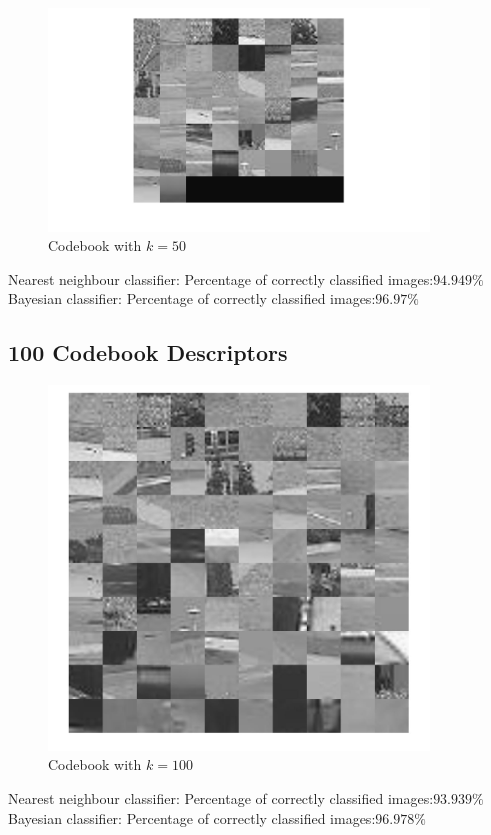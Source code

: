 \documentclass[12pt]{article}
\begin{document}
\vspace{5mm}
\begin{figure}[H]
	\centering
	\includegraphics[width=0.9\textwidth]{k50.jpg}
	\caption{Codebook with $k=50$}
	\label{fig1}
\end{figure}
\vspace{5mm}
Nearest neighbour classifier: 
\newline
Percentage of correctly classified images:$94.949\%$
\vspace{5mm}
\newline
Bayesian classifier: 
\newline
Percentage of correctly classified images:$96.97\%$
\subsection{100 Codebook Descriptors}

\vspace{5mm}
\begin{figure}[H]
	\centering
	\includegraphics[width=0.9\textwidth]{k100.jpg}
	\caption{Codebook with $k=100$}
	\label{fig1}
\end{figure}
\vspace{5mm}
Nearest neighbour classifier: 
\newline
Percentage of correctly classified images:$93.939\%$
\vspace{5mm}
\newline
Bayesian classifier: 
\newline
Percentage of correctly classified images:$96.978\%$
\end{document}

